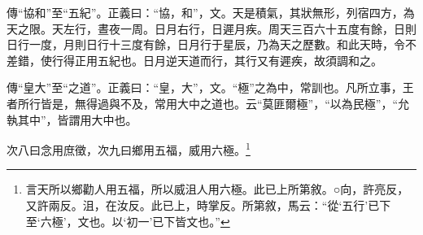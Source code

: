 {\noindent\zhuan{}\fzbyks 傳“協和”至“五紀”。正義曰：“協，和”，文。天是積氣，其狀無形，列宿四方，為天之限。天左行，晝夜一周。日月右行，日遲月疾。周天三百六十五度有餘，日則日行一度，月則日行十三度有餘，日月行于星辰，乃為天之歷數。和此天時，令不差錯，使行得正用五紀也。日月逆天道而行，其行又有遲疾，故須調和之。 \par}

{\noindent\zhuan{}\fzbyks 傳“皇大”至“之道”。正義曰：“皇，大”，文。“極”之為中，常訓也。凡所立事，王者所行皆是，無得過與不及，常用大中之道也。云“莫匪爾極”，“以為民極”，“允執其中”，皆謂用大中也。 \par}

次八曰念用庶徵，次九曰鄉用五福，威用六極。\footnote{言天所以鄉勸人用五福，所以威沮人用六極。此已上所第敘。○向，許亮反，又許兩反。沮，在汝反。此已上，時掌反。所第敘，馬云：“從‘五行’已下至‘六極’，文也。以‘初一’已下皆文也。”}

